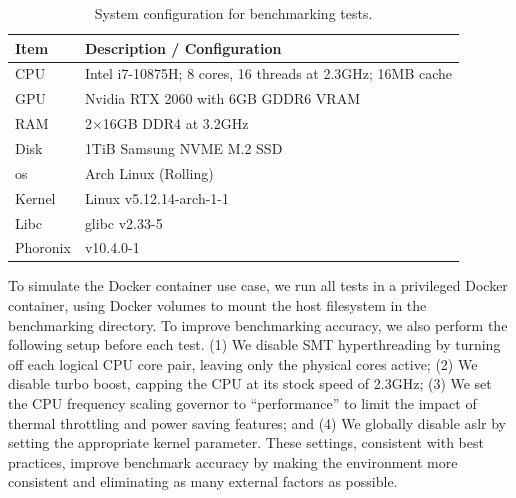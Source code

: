 \begin{table}[htp]
  \centering
  \footnotesize
  \caption[System configuration for benchmarking tests]{System configuration for benchmarking tests.}%
  \label{tab:system-config}
  \begin{tabular}{ll}
  \toprule
  Item & Description / Configuration \\
  \midrule
  CPU & Intel i7-10875H; 8 cores, 16 threads at 2.3GHz; 16MB cache\\
  GPU & Nvidia RTX 2060 with 6GB GDDR6 VRAM \\
  RAM & 2$\times$16GB DDR4 at 3.2GHz \\
  Disk & 1TiB Samsung NVME M.2 SSD \\
  \midrule
  \gls{os} & Arch Linux (Rolling) \\
  Kernel & Linux v5.12.14-arch-1-1 \\
  Libc & glibc v2.33-5 \\
  Phoronix & v10.4.0-1 \\
  \bottomrule
  \end{tabular}
\end{table}

To simulate the Docker container use case, we run all tests in a privileged Docker
container, using Docker volumes to mount the host filesystem in the benchmarking
directory. To improve benchmarking accuracy, we also perform the following setup before
each test. (1) We disable SMT hyperthreading by turning off each logical CPU core pair,
leaving only the physical cores active; (2) We disable turbo boost, capping the CPU at its
stock speed of 2.3GHz; (3) We set the CPU frequency scaling governor to
\enquote{performance} to limit the impact of thermal throttling and power saving features;
and (4) We globally disable \gls{aslr} by setting the appropriate kernel parameter. These
settings, consistent with best practices, improve benchmark accuracy by making the
environment more consistent and eliminating as many external factors as possible.

